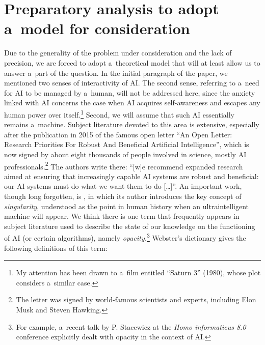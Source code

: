 \section{Preparatory analysis to adopt a~model for consideration}
Due to the generality of the problem under consideration and the lack of precision, we are forced to adopt a~theoretical model that will at least allow us to answer a~part of the question. In the initial paragraph of the paper, we mentioned two senses of interactivity of AI. The second sense, referring to a~need for AI to be managed by a~human, will not be addressed here, since the anxiety linked with AI concerns the case when AI acquires self-awareness and escapes any human power over itself.\footnote{ My attention has been drawn to a~film entitled ``Saturn 3'' (1980), whose plot considers a~similar case.} Second, we will assume that such AI essentially remains a~machine. Subject literature devoted to this area is extensive, especially after the publication in 2015 of the famous open letter ``An Open Letter: Research Priorities For Robust And Beneficial Artificial Intelligence'', which is now signed by about eight thousands of people involved in science, mostly AI professionals.\footnote{ The letter was signed by world-famous scientists and experts, including Elon Musk and Steven Hawking.} The authors write there: ``[w]e recommend expanded research aimed at ensuring that increasingly capable AI systems are robust and beneficial: our AI systems must do what we want them to do […]''. An important work, though long forgotten, is
\parencite[][]{good_speculations_1965}, %
 in which its author introduces the key concept of \textit{singularity}, understood as the point in human history when an ultraintelligent machine will appear. We think there is one term that frequently appears in subject literature used to describe the state of our knowledge on the functioning of AI (or certain algorithms), namely \textit{opacity.}\footnote{ For example, a~recent talk by P. Stacewicz at the \textit{Homo informaticus 8.0} conference explicitly dealt with opacity in the context of AI.} Webster's dictionary gives the following definitions of this term:

